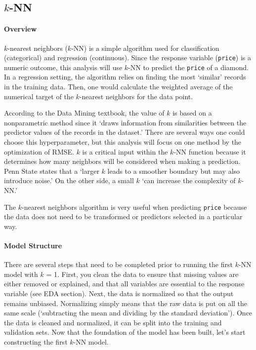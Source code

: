 \documentclass[
  paper=a4,
  ,captions=tableheading
]{scrartcl}
\begin{document}
\hypertarget{k-nn}{%
\subsection{\texorpdfstring{\(k\)-NN}{k-NN}}\label{k-nn}}

\hypertarget{overview}{%
\paragraph{Overview}\label{overview}}

\(k\)-nearest neighbors (\(k\)-NN) is a simple algorithm used for
classification (categorical) and regression (continuous). Since the
response variable (\texttt{price}) is a numeric outcome, this analysis
will use \(k\)-NN to predict the \texttt{price} of a diamond. In a
regression setting, the algorithm relies on finding the most `similar'
records in the training data. Then, one would calculate the weighted
average of the numerical target of the \(k\)-nearest neighbors for the
data point.

According to the Data Mining textbook, the value of \(k\) is based on a
nonparametric method since it `draws information from similarities
between the predictor values of the records in the dataset.' There are
several ways one could choose this hyperparameter, but this analysis
will focus on one method by the optimization of RMSE. \(k\) is a
critical input within the \(k\)-NN function because it determines how
many neighbors will be considered when making a prediction. Penn State
states that a `larger \(k\) leads to a smoother boundary but may also
introduce noise.' On the other side, a small \(k\) `can increase the
complexity of \(k\)-NN.'

The \(k\)-nearest neighbors algorithm is very useful when predicting
\texttt{price} because the data does not need to be transformed or
predictors selected in a particular way.

\hypertarget{model-structure}{%
\paragraph{Model Structure}\label{model-structure}}

There are several steps that need to be completed prior to running the
first \(k\)-NN model with \(k\) = 1. First, you clean the data to ensure
that missing values are either removed or explained, and that all
variables are essential to the response variable (see EDA section).
Next, the data is normalized so that the output remains unbiased.
Normalizing simply means that the raw data is put on all the same scale
(`subtracting the mean and dividing by the standard deviation'). Once
the data is cleaned and normalized, it can be split into the training
and validation sets. Now that the foundation of the model has been
built, let's start constructing the first \(k\)-NN model.
\end{document}
